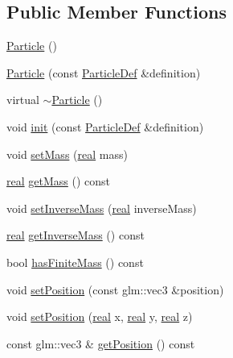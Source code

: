 \subsection*{Public Member Functions}
\begin{DoxyCompactItemize}
\item 
\mbox{\hyperlink{classr3_1_1_particle_a72d4ae82278e293bf0933a1aabbe9ac3}{Particle}} ()
\item 
\mbox{\hyperlink{classr3_1_1_particle_a28a47b80f79433db842a47aca835003a}{Particle}} (const \mbox{\hyperlink{structr3_1_1_particle_def}{Particle\+Def}} \&definition)
\item 
virtual \mbox{\hyperlink{classr3_1_1_particle_a235fd8a567a6ec911f26ca49a8045460}{$\sim$\+Particle}} ()
\item 
void \mbox{\hyperlink{classr3_1_1_particle_a660673cfa03f0195560df72c659b22a5}{init}} (const \mbox{\hyperlink{structr3_1_1_particle_def}{Particle\+Def}} \&definition)
\item 
void \mbox{\hyperlink{classr3_1_1_particle_a01f396041b3b54d674e227d56d600f6b}{set\+Mass}} (\mbox{\hyperlink{namespacer3_ab2016b3e3f743fb735afce242f0dc1eb}{real}} mass)
\item 
\mbox{\hyperlink{namespacer3_ab2016b3e3f743fb735afce242f0dc1eb}{real}} \mbox{\hyperlink{classr3_1_1_particle_a589224b38f870653d35fc2fa0aae1e25}{get\+Mass}} () const
\item 
void \mbox{\hyperlink{classr3_1_1_particle_a6219cdcf36221881e92fbe548a682bed}{set\+Inverse\+Mass}} (\mbox{\hyperlink{namespacer3_ab2016b3e3f743fb735afce242f0dc1eb}{real}} inverse\+Mass)
\item 
\mbox{\hyperlink{namespacer3_ab2016b3e3f743fb735afce242f0dc1eb}{real}} \mbox{\hyperlink{classr3_1_1_particle_ac495537e7d4089fa394abb3fed213b93}{get\+Inverse\+Mass}} () const
\item 
bool \mbox{\hyperlink{classr3_1_1_particle_a7517367ac5587d97d783429585ec0e90}{has\+Finite\+Mass}} () const
\item 
void \mbox{\hyperlink{classr3_1_1_particle_a22926644001b62f3e8bf1f9cf02b64e9}{set\+Position}} (const glm\+::vec3 \&position)
\item 
void \mbox{\hyperlink{classr3_1_1_particle_ac0d83f2396049b51383c692a70c44b34}{set\+Position}} (\mbox{\hyperlink{namespacer3_ab2016b3e3f743fb735afce242f0dc1eb}{real}} x, \mbox{\hyperlink{namespacer3_ab2016b3e3f743fb735afce242f0dc1eb}{real}} y, \mbox{\hyperlink{namespacer3_ab2016b3e3f743fb735afce242f0dc1eb}{real}} z)
\item 
const glm\+::vec3 \& \mbox{\hyperlink{classr3_1_1_particle_a6f61c64625f2d9bf7fe1145d74790a92}{get\+Position}} () const

\end{DoxyCompactItemize}
